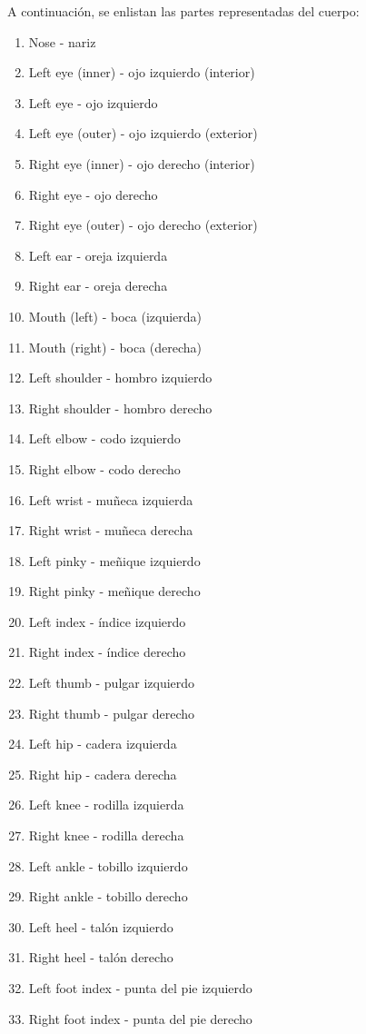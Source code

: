 A continuación, se enlistan las partes representadas del cuerpo:

\begin{enumerate}
    \item Nose - nariz  
    \item Left eye (inner) - ojo izquierdo (interior)  
    \item Left eye - ojo izquierdo  
    \item Left eye (outer) - ojo izquierdo (exterior)  
    \item Right eye (inner) - ojo derecho (interior)  
    \item Right eye - ojo derecho  
    \item Right eye (outer) - ojo derecho (exterior)  
    \item Left ear - oreja izquierda  
    \item Right ear - oreja derecha  
    \item Mouth (left) - boca (izquierda)  
    \item Mouth (right) - boca (derecha)  
    \item Left shoulder - hombro izquierdo  
    \item Right shoulder - hombro derecho  
    \item Left elbow - codo izquierdo  
    \item Right elbow - codo derecho  
    \item Left wrist - muñeca izquierda  
    \item Right wrist - muñeca derecha  
    \item Left pinky - meñique izquierdo  
    \item Right pinky - meñique derecho  
    \item Left index - índice izquierdo  
    \item Right index - índice derecho  
    \item Left thumb - pulgar izquierdo  
    \item Right thumb - pulgar derecho  
    \item Left hip - cadera izquierda  
    \item Right hip - cadera derecha  
    \item Left knee - rodilla izquierda  
    \item Right knee - rodilla derecha  
    \item Left ankle - tobillo izquierdo  
    \item Right ankle - tobillo derecho  
    \item Left heel - talón izquierdo  
    \item Right heel - talón derecho  
    \item Left foot index - punta del pie izquierdo  
    \item Right foot index - punta del pie derecho  
\end{enumerate}

